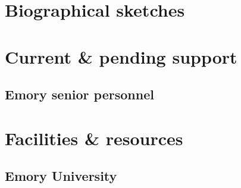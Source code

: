 \documentclass[11pt]{article}
\begin{document}









\pagebreak


\appendix

\section{Biographical sketches}
\label{app:bios}



\section{Current \& pending support}
\label{sec:current--pending}

\subsection{Emory senior personnel}


\pagebreak


\section{Facilities \& resources}

\subsection{Emory University}


\end{document}
